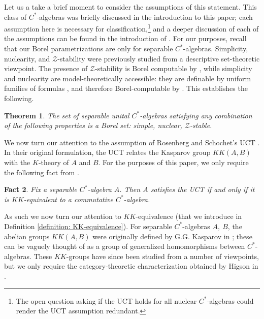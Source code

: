 \documentclass[12pt]{amsart}
\newtheorem{theorem}{Theorem}[section]
\newtheorem{fact}[theorem]{Fact}
\newcommand{\cZ}{\mathcal{Z}}
\begin{document}
Let us a take a brief moment to consider the assumptions of this statement. This class of $C^*$-algebras was briefly discussed in the introduction to this paper; each assumption here is necessary for classification,\footnote{The open question asking if the UCT holds for all nuclear $C^*$-algebras could render the UCT assumption redundant.} and a deeper discussion of each of the assumptions can be found in the introduction of \cite{CGSTW-new-classificationI-2023}. 
For our purposes, recall that our Borel parametrizations are only for separable $C^*$-algebras. 
Simplicity, nuclearity, and $\cZ$-stability were previously studied from a descriptive set-theoretic viewpoint. 
The presence of $\cZ$-stability is Borel computable by \cite[Theorem 1.1(vi)]{farah2013descriptive}, while simplicity and nuclearity are model-theoretically accessible: they are definable by uniform families of formulas \cite[Theorem 5.7.3(3), (6)]{farah2021MTofC*}, and therefore Borel-computable by \cite[Proposition 5.17.1]{farah2021MTofC*}. This establishes the following.

\begin{theorem} \label{thm: USSN Z-stable is Borel}
    The set of separable unital $C^*$-algebras satisfying any combination of the following properties is a Borel set: simple, nuclear, $\cZ$-stable.
\end{theorem}

We now turn our attention to the assumption of Rosenberg and Schochet's UCT \cite{RosenbergSchochetUCT}. 
In their original formulation, the UCT relates the Kasparov group $KK(A, B)$ with the $K$-theory of $A$ and $B$. For the purposes of this paper, we only require the following fact from \cite[Section 7]{RosenbergSchochetUCT}.

\begin{fact} \label{fact: UCT KK-equiv-to-commutative}
    Fix a separable $C^*$-algebra $A$. Then $A$ satisfies the UCT if and only if it is $KK$-equivalent to a commutative $C^*$-algebra.
\end{fact}

As such we now turn our attention to $KK$-equivalence (that we introduce in Definition \ref{definition: KK-equivalence}).
For separable $C^*$-algebras $A, \ B$, the abelian groups $KK(A, B)$ were originally defined by G.G. Kasparov in \cite{Kasparov1981-origKK}; these can be vaguely thought of as a group of generalized homomorphisms between $C^*$-algebras. 
These $KK$-groups have since been studied from a number of viewpoints, but we only require the category-theoretic characterization obtained by Higson in \cite{Higson-KKtheory}.
\end{document}
